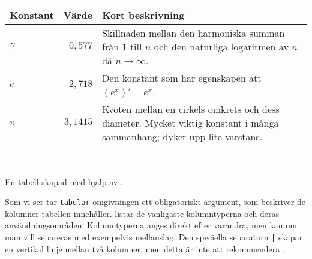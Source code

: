 \documentclass[10pt,../../a4.tex]{subfiles}
\begin{document}
\begin{kod}[tbp]
	\centering 
	\begin{minipage}{0.9\textwidth} %
		\begin{latexcode}
\begin{tabular}{l r p{4cm}}
\toprule 
Konstant & Värde & Kort beskrivning \\
\midrule 
\(\gamma\) & \(0,577\) & Skillnaden mellan den
 harmoniska summan från \(1\) till \(n\) och den
 naturliga logaritmen av \(n\) då \(n\to\infty\).\\
\(e\) & \(2,718\) & Den konstant som har
egenskapen att \((e^x)' = e^x\). \\
\(\pi\) & \(3,1415\) & Kvoten mellan en cirkels
 omkrets och dess diameter. Mycket viktig
 konstant i många sammanhang; dyker upp
 lite varstans. \\
\bottomrule
\end{tabular}
		\end{latexcode}
	\end{minipage}
	\\ \medskip
	\caption{En tabell skapad med hjälp av .}
	\label{ex:tabular}
\end{kod}

Som vi ser tar \texttt{tabular}-omgivningen ett obligatoriskt argument,
som beskriver de kolumner tabellen innehåller. 
listar de vanligaste kolumntyperna och deras användningsområden.
Kolumntyperna anges direkt efter varandra, men kan om man vill separeras
med exempelvis mellanslag. Den speciella separatorn \texttt{|} skapar en
vertikal linje mellan två kolumner, men detta är inte att rekommendera
\parencite{Fear05}.
\end{document}
